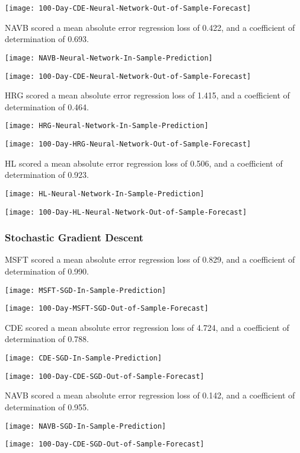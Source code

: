 \texttt{[image: 100-Day-CDE-Neural-Network-Out-of-Sample-Forecast]}

NAVB scored a mean absolute error regression loss of 0.422, and a coefficient of determination of 0.693.

\texttt{[image: NAVB-Neural-Network-In-Sample-Prediction]}

\texttt{[image: 100-Day-CDE-Neural-Network-Out-of-Sample-Forecast]}

HRG scored a mean absolute error regression loss of 1.415, and a coefficient of determination of 0.464.

\texttt{[image: HRG-Neural-Network-In-Sample-Prediction]}

\texttt{[image: 100-Day-HRG-Neural-Network-Out-of-Sample-Forecast]}

HL scored a mean absolute error regression loss of 0.506, and a coefficient of determination of 0.923.

\texttt{[image: HL-Neural-Network-In-Sample-Prediction]}

\texttt{[image: 100-Day-HL-Neural-Network-Out-of-Sample-Forecast]}

\subsubsection{Stochastic Gradient Descent}
MSFT scored a mean absolute error regression loss of 0.829, and a coefficient of determination of 0.990.

\texttt{[image: MSFT-SGD-In-Sample-Prediction]}

\texttt{[image: 100-Day-MSFT-SGD-Out-of-Sample-Forecast]}

CDE scored a mean absolute error regression loss of 4.724, and a coefficient of determination of 0.788.

\texttt{[image: CDE-SGD-In-Sample-Prediction]}

\texttt{[image: 100-Day-CDE-SGD-Out-of-Sample-Forecast]}

NAVB scored a mean absolute error regression loss of 0.142, and a coefficient of determination of 0.955.

\texttt{[image: NAVB-SGD-In-Sample-Prediction]}

\texttt{[image: 100-Day-CDE-SGD-Out-of-Sample-Forecast]}

